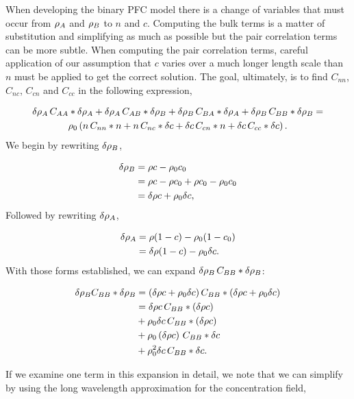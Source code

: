 When developing the binary PFC model there is a change of variables that must occur from $\rho_A$ and $\rho_B$ to $n$ and $c$. Computing the bulk terms is a matter of substitution and simplifying as much as possible but the pair correlation terms can be more subtle. When computing the pair correlation terms, careful application of our assumption that $c$ varies over a much longer length scale than $n$ must be applied to get the correct solution. The goal, ultimately, is to find $C_{n n}$, $C_{n c}$, $C_{c n}$ and $C_{c c}$ in the following expression, 

\begin{gather}\label{1}
  \delta \rho_A \,C_{AA} \ast \delta \rho_A + \delta \rho_A \,C_{AB} \ast \delta \rho_B + \delta \rho_B \,C_{BA} \ast \delta \rho_A + \delta \rho_B \,C_{BB} \ast \delta \rho_B = \\ \nonumber
  \rho_0 \left(n \,C_{nn} \ast n + n \,C_{nc} \ast \delta c + \delta c \,C_{cn}\ast n + \delta c \,C_{cc} \ast \delta c\right).
\end{gather}
We begin by rewriting $\delta \rho_B$,

\begin{align*}
  \delta \rho_B &= \rho c - \rho_0 c_0 \\
        &= \rho c - \rho c_0 + \rho c_0 - \rho_0 c_0 \\
        &= \delta \rho c + \rho_0 \delta c,
\end{align*}
Followed by rewriting $\delta \rho_A$,

\begin{align*}
  \delta \rho_A &= \rho (1 - c) - \rho_0 (1 - c_0) \\
        &= \delta \rho (1 - c) - \rho_0 \delta c.
\end{align*}
With those forms established, we can expand $\delta \rho_B \,C_{BB} \ast \delta \rho_B$:

\begin{align}\label{this}
  \delta \rho_B C_{BB} \ast \delta \rho_B &= \left(\delta \rho c + \rho_0 \delta c \right) C_{BB} \ast \left(\delta \rho c + \rho_0 \delta c\right) \nonumber\\
                          &= \delta \rho c \,C_{BB} \ast \left( \delta \rho c\right) \nonumber\\
                          &+ \rho_0 \delta c \,C_{BB} \ast \left( \delta \rho c \right) \\
                          &+ \rho_0 \left(\delta \rho c\right) \,C_{BB} \ast \delta c \nonumber\\
                          &+ \rho_0^2 \delta c \,C_{BB} \ast \delta c. \nonumber
\end{align}

If we examine one term in this expansion in detail, we note that we can simplify by using the long wavelength approximation for the concentration field,

